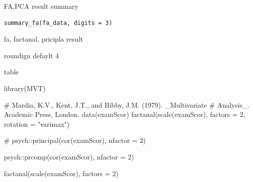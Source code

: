 \documentclass[a4paper]{book}
\begin{document}
%
\begin{Description}
FA,PCA result summary
\end{Description}
%
\begin{Usage}
\begin{verbatim}
summary_fa(fa_data, digits = 3)
\end{verbatim}
\end{Usage}
%
\begin{Arguments}
\begin{ldescription}
\item[\code{fa\_data}] fa, factanal, pricipla result

\item[\code{digits}] roundign defaylt 4
\end{ldescription}
\end{Arguments}
%
\begin{Value}
table
\end{Value}
%
\begin{Examples}
\begin{ExampleCode}

library(MVT)

#  Mardia, K.V., Kent, J.T., and Bibby, J.M. (1979).  _Multivariate
#  Analysis_. Academic Press, London.
data(examScor)
factanal(scale(examScor), factors = 2, rotation = "varimax")%

\#
psych::principal(cor(examScor), nfactor = 2) %

psych::prcomp(cor(examScor), nfactor = 2) %

factanal(scale(examScor), factors = 2) %

\end{ExampleCode}
\end{Examples}
\end{document}
